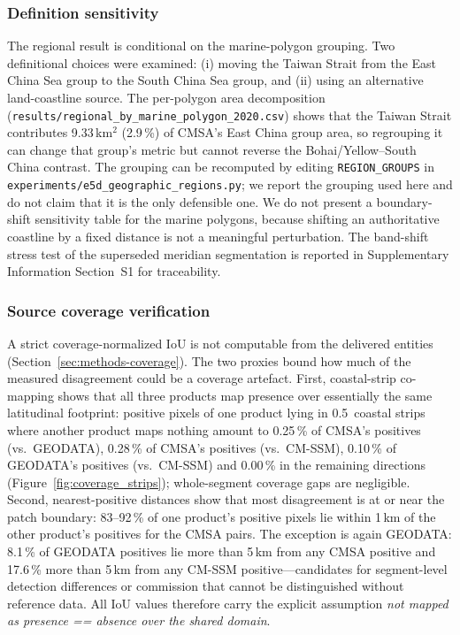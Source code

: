\documentclass[11pt]{article}
\begin{document}
\subsubsection{Definition sensitivity}
\label{sec:boundary-sens}

The regional result is conditional on the marine-polygon grouping. Two
definitional choices were examined: (i) moving the Taiwan Strait from the
East China Sea group to the South China Sea group, and (ii) using an
alternative land-coastline source. The per-polygon area decomposition
(\texttt{results/regional\_by\_marine\_polygon\_2020.csv}) shows that the
Taiwan Strait contributes 9.33\,km$^2$ (2.9\,\%) of CMSA's East China group
area, so regrouping it can change that group's metric but cannot reverse the
Bohai/Yellow--South China contrast. The grouping can be recomputed by editing
\texttt{REGION\_GROUPS} in \texttt{experiments/e5d\_geographic\_regions.py};
we report the grouping used here and do not claim that it is the only
defensible one. We do not present a boundary-shift sensitivity table for the
marine polygons, because shifting an authoritative coastline by a fixed
distance is not a meaningful perturbation. The band-shift stress test of the
superseded meridian segmentation is reported in Supplementary Information
Section~S1 for traceability.

\subsubsection{Source coverage verification}
\label{sec:coverage-audit}

A strict coverage-normalized IoU is not computable from the delivered
entities (Section~\ref{sec:methods-coverage}). The two proxies bound how
much of the measured disagreement could be a coverage artefact. First,
coastal-strip co-mapping shows that all three products map presence over
essentially the same latitudinal footprint: positive pixels of one product
lying in 0.5\,\textdegree{} coastal strips where another product maps
nothing amount to 0.25\,\% of CMSA's positives (vs.\ GEODATA), 0.28\,\% of
CMSA's positives (vs.\ CM-SSM), 0.10\,\% of GEODATA's positives (vs.\
CM-SSM) and 0.00\,\% in the remaining directions
(Figure~\ref{fig:coverage_strips}); whole-segment coverage gaps are
negligible. Second, nearest-positive distances show that most disagreement
is at or near the patch boundary: 83--92\,\% of one product's positive
pixels lie within 1\,km of the other product's positives for the CMSA
pairs. The exception is again GEODATA: 8.1\,\% of GEODATA positives lie
more than 5\,km from any CMSA positive and 17.6\,\% more than 5\,km from
any CM-SSM positive---candidates for segment-level detection differences
or commission that cannot be distinguished without reference data. All IoU
values therefore carry the explicit assumption \emph{not mapped as presence
== absence over the shared domain}.
\end{document}
